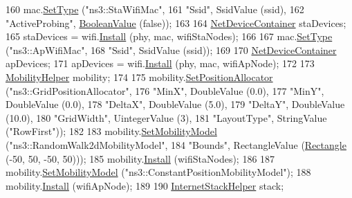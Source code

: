 \begin{DoxyCode}
160   mac.\hyperlink{classns3_1_1WifiMacHelper_a382d8df76a1dd7007179d1963b4b6bc6}{SetType} (\textcolor{stringliteral}{"ns3::StaWifiMac"},
161                \textcolor{stringliteral}{"Ssid"}, SsidValue (ssid),
162                \textcolor{stringliteral}{"ActiveProbing"}, \hyperlink{classns3_1_1BooleanValue}{BooleanValue} (\textcolor{keyword}{false}));
163 
164   \hyperlink{classns3_1_1NetDeviceContainer}{NetDeviceContainer} staDevices;
165   staDevices = wifi.\hyperlink{classns3_1_1WifiHelper_a451b3d33fa1497c22f06c5451f57a127}{Install} (phy, mac, wifiStaNodes);
166 
167   mac.\hyperlink{classns3_1_1WifiMacHelper_a382d8df76a1dd7007179d1963b4b6bc6}{SetType} (\textcolor{stringliteral}{"ns3::ApWifiMac"},
168                \textcolor{stringliteral}{"Ssid"}, SsidValue (ssid));
169 
170   \hyperlink{classns3_1_1NetDeviceContainer}{NetDeviceContainer} apDevices;
171   apDevices = wifi.\hyperlink{classns3_1_1WifiHelper_a451b3d33fa1497c22f06c5451f57a127}{Install} (phy, mac, wifiApNode);
172 
173   \hyperlink{classns3_1_1MobilityHelper}{MobilityHelper} mobility;
174 
175   mobility.\hyperlink{classns3_1_1MobilityHelper_ac59d5295076be3cc11021566713a28c5}{SetPositionAllocator} (\textcolor{stringliteral}{"ns3::GridPositionAllocator"},
176                                  \textcolor{stringliteral}{"MinX"}, DoubleValue (0.0),
177                                  \textcolor{stringliteral}{"MinY"}, DoubleValue (0.0),
178                                  \textcolor{stringliteral}{"DeltaX"}, DoubleValue (5.0),
179                                  \textcolor{stringliteral}{"DeltaY"}, DoubleValue (10.0),
180                                  \textcolor{stringliteral}{"GridWidth"}, UintegerValue (3),
181                                  \textcolor{stringliteral}{"LayoutType"}, StringValue (\textcolor{stringliteral}{"RowFirst"}));
182 
183   mobility.\hyperlink{classns3_1_1MobilityHelper_a030275011b6f40682e70534d30280aba}{SetMobilityModel} (\textcolor{stringliteral}{"ns3::RandomWalk2dMobilityModel"},
184                              \textcolor{stringliteral}{"Bounds"}, RectangleValue (\hyperlink{classns3_1_1Rectangle}{Rectangle} (-50, 50, -50, 50)));
185   mobility.\hyperlink{classns3_1_1MobilityHelper_a07737960ee95c0777109cf2994dd97ae}{Install} (wifiStaNodes);
186 
187   mobility.\hyperlink{classns3_1_1MobilityHelper_a030275011b6f40682e70534d30280aba}{SetMobilityModel} (\textcolor{stringliteral}{"ns3::ConstantPositionMobilityModel"});
188   mobility.\hyperlink{classns3_1_1MobilityHelper_a07737960ee95c0777109cf2994dd97ae}{Install} (wifiApNode);
189 
190   \hyperlink{classns3_1_1InternetStackHelper}{InternetStackHelper} stack;

\end{DoxyCode}
